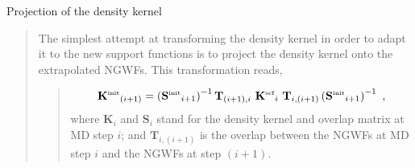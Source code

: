 \documentclass[letterpaper,10pt,english]{sphinxmanual}
\begin{document}
Projection of the density kernel
\begin{quote}

\begin{DUlineblock}{0em}
\item[] The simplest attempt at transforming the density kernel in order
to adapt it to the new support functions is to project the density
kernel onto the extrapolated NGWFs. This transformation reads,
\end{DUlineblock}
\begin{quote}
\begin{equation*}
\begin{split}\mathbf{K}{^{\mbox{\tiny{init}}}}_{(i+1)} = \left(\mathbf{S}{^{\mbox{\tiny{init}}}}_{i+1}\right)^{-1} \mathbf{T}_{(i+1),i} \ \mathbf{K}{^{\mbox{\tiny{scf}}}}_{i} \ \mathbf{T}_{i,(i+1)} \left(\mathbf{S}{^{\mbox{\tiny{init}}}}_{i+1}\right)^{-1} \ ,\end{split}
\end{equation*}
where \(\mathbf{K}_i\) and \(\mathbf{S}_i\) stand for the
density kernel and overlap matrix at MD step \(i\); and
\(\mathbf{T}_{i,(i+1)}\) is the overlap between the NGWFs at
MD step \(i\) and the  NGWFs at step
\((i+1)\).
\end{quote}
\end{quote}
\end{document}

